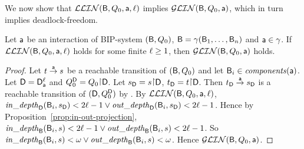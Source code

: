 \vspace{0.5ex}

\noindent
We now show that $\mathcal{LLIN}(\mathsf{B}, Q_0, \mathsf{a}, \ell)$ implies $\mathcal{GLIN}(\mathsf{B}, Q_0, \mathsf{a})$, which in turn implies deadlock-freedom.  

\begin{lemma}
\label{lemma:loc-implies-glob}
\label{lem:locLinear-implies-globlinear}
\label{lemma:locLinear-implies-globlinear}
\label{LLinGLin}
Let $\mathsf{a}$ be an interaction of BIP-system $(\mathsf{B}, Q_0)$, \ie $\mathsf{B} = \gamma(\mathsf{B}_1,\dots,\mathsf{B}_n)$ and $\mathsf{a} \in \gamma$.
If $\mathcal{LLIN}(\mathsf{B}, Q_0, \mathsf{a}, \ell)$ holds for some finite $\ell \ge 1$, then $\mathcal{GLIN}(\mathsf{B}, Q_0, \mathsf{a})$ holds.
\end{lemma}
%
\begin{proof}
Let $t \stackrel{\mathsf{a}}{\rightarrow} s$ be a reachable transition of $(\mathsf{B}, Q_0)$ and let $\mathsf{B}_i \in \mathit{components}(\mathsf{a})$.
Let $\mathsf{D} = \mathsf{D}_{\mathsf{a}}^{\ell}$ and $\QDS = Q_0 \pj \DS$.
Let $\sD = s \pj \DS$, $\tD = t \pj \DS$.
Then $t_\mathsf{D} \stackrel{\mathsf{a}}{\rightarrow} s_\mathsf{D}$ is a reachable transition of $(\mathsf{D}, Q_0^{\mathsf{D}})$ by .
By $\mathcal{LLIN}(\mathsf{B}, Q_0, \mathsf{a}, \ell)$, 
$\mathit{in\_depth}_{\mathsf{D}}({\mathsf{B}_i, s_\mathsf{D}}) < 2\ell-1 \lor \mathit{out\_depth}_{\mathsf{D}}({\mathsf{B}_i, s_\mathsf{D}}) < 2\ell-1$.
Hence by Proposition~\ref{prop:in-out-projection},
$\mathit{in\_depth}_{\mathsf{B}}({\mathsf{B}_i, s}) < 2\ell-1 \lor \mathit{out\_depth}_{\mathsf{B}}({\mathsf{B}_i, s}) < 2\ell-1$.
So
$\mathit{in\_depth}_{\mathsf{B}}({\mathsf{B}_i, s}) < \omega \lor \mathit{out\_depth}_{\mathsf{B}}({\mathsf{B}_i, s}) < \omega$.
Hence $\mathcal{GLIN}(\mathsf{B}, Q_0, \mathsf{a})$.
\end{proof}








